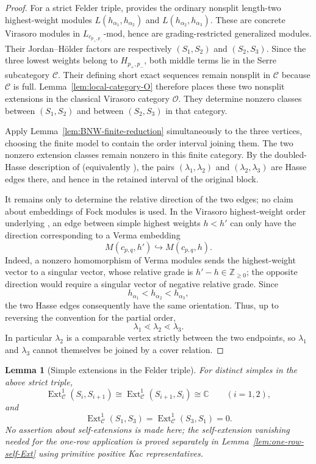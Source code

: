 \documentclass[12pt,leqno]{amsart}
\numberwithin{equation}{section}
\newtheorem{lem}[thm]{Lemma}
\newcommand{\Ext}{\operatorname{Ext}}
\def\Z{\mathbb{Z}}
\def\C{\mathbb{C}}
\begin{document}
\begin{proof}
For a strict Felder triple, \cite[Definition~5.9]{Nakano} provides the
ordinary nonsplit length-two highest-weight modules
$L(h_{\alpha_1},h_{\alpha_2})$ and
$L(h_{\alpha_2},h_{\alpha_3})$.  These are concrete Virasoro modules in
$L_{c_{p_+,p_-}}\text{-mod}$, hence are grading-restricted generalized
modules.  Their Jordan--H\"older factors are respectively $(S_1,S_2)$
and $(S_2,S_3)$.  Since the three lowest weights belong to
$H_{p_+,p_-}$, both middle terms lie in the Serre subcategory
$\mathscr C$.  Their defining short exact sequences remain nonsplit in
$\mathscr C$ because $\mathscr C$ is full.
Lemma~\ref{lem:local-category-O} therefore places these two nonsplit
extensions in the classical Virasoro category $\mathcal O$.  They
determine nonzero classes between $(S_1,S_2)$ and between $(S_2,S_3)$
in that category.

Apply Lemma~\ref{lem:BNW-finite-reduction} simultaneously to the three
vertices, choosing the finite model to contain the order interval joining
them.  The two nonzero extension classes remain nonzero in this finite
category.  By the doubled-Hasse description of
\cite[Section~4.4]{BoeNakanoWiesner} (equivalently
\cite[Theorem~10]{BoeNakanoWiesner}), the pairs
$(\lambda_1,\lambda_2)$ and $(\lambda_2,\lambda_3)$ are Hasse edges
there, and hence in the retained interval of the original block.

It remains only to determine the relative direction of the two edges; no
claim about embeddings of Fock modules is used.  In the Virasoro
highest-weight order underlying \cite{BoeNakanoWiesner}, an edge between
simple highest weights $h<h'$ can only have the direction corresponding
to a Verma embedding
\[
 M(c_{p,q},h')\hookrightarrow M(c_{p,q},h).
\]
Indeed, a nonzero homomorphism of Verma modules sends the highest-weight
vector to a singular vector, whose relative grade is $h'-h\in\Z_{\ge0}$;
the opposite direction would require a singular vector of negative
relative grade.  Since
\[
 h_{\alpha_1}<h_{\alpha_2}<h_{\alpha_3},
\]
the two Hasse edges consequently have the same orientation.  Thus, up to
reversing the convention for the partial order,
\[
 \lambda_1\lessdot\lambda_2\lessdot\lambda_3.
\]
In particular $\lambda_2$ is a comparable vertex strictly between the
two endpoints, so $\lambda_1$ and $\lambda_3$ cannot themselves be
joined by a cover relation.
\end{proof}

\begin{lem}[Simple extensions in the Felder triple]
\label{lem:local-simple-Ext}
For distinct simples in the above strict triple,
\[
 \Ext^1_{\mathscr C}(S_i,S_{i+1})
 \cong
 \Ext^1_{\mathscr C}(S_{i+1},S_i)
 \cong\C
 \qquad(i=1,2),
\]
and
\[
 \Ext^1_{\mathscr C}(S_1,S_3)
 =
 \Ext^1_{\mathscr C}(S_3,S_1)=0.
\]
No assertion about self-extensions is made here; the self-extension
vanishing needed for the one-row application is proved separately in
Lemma~\ref{lem:one-row-self-Ext} using primitive positive Kac
representatives.
\end{lem}
\end{document}
